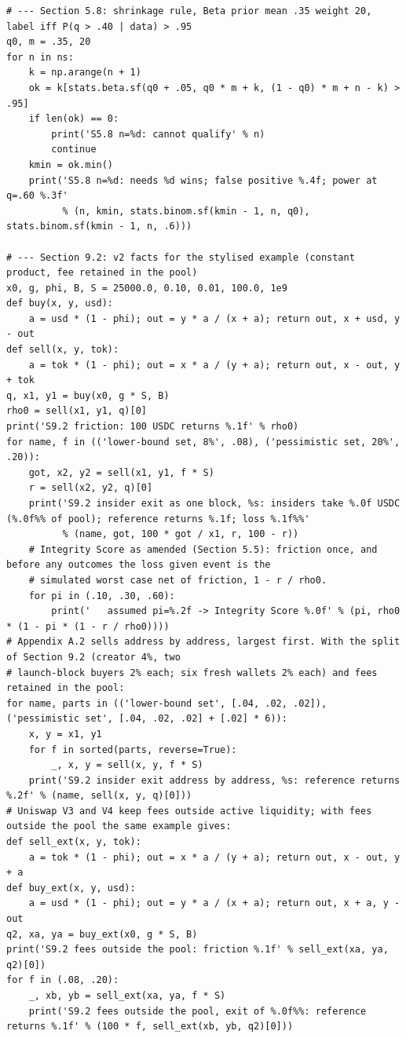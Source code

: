 \begin{verbatim}
# --- Section 5.8: shrinkage rule, Beta prior mean .35 weight 20, label iff P(q > .40 | data) > .95
q0, m = .35, 20
for n in ns:
    k = np.arange(n + 1)
    ok = k[stats.beta.sf(q0 + .05, q0 * m + k, (1 - q0) * m + n - k) > .95]
    if len(ok) == 0:
        print('S5.8 n=%d: cannot qualify' % n)
        continue
    kmin = ok.min()
    print('S5.8 n=%d: needs %d wins; false positive %.4f; power at q=.60 %.3f'
          % (n, kmin, stats.binom.sf(kmin - 1, n, q0), stats.binom.sf(kmin - 1, n, .6)))

# --- Section 9.2: v2 facts for the stylised example (constant product, fee retained in the pool)
x0, g, phi, B, S = 25000.0, 0.10, 0.01, 100.0, 1e9
def buy(x, y, usd):
    a = usd * (1 - phi); out = y * a / (x + a); return out, x + usd, y - out
def sell(x, y, tok):
    a = tok * (1 - phi); out = x * a / (y + a); return out, x - out, y + tok
q, x1, y1 = buy(x0, g * S, B)
rho0 = sell(x1, y1, q)[0]
print('S9.2 friction: 100 USDC returns %.1f' % rho0)
for name, f in (('lower-bound set, 8%', .08), ('pessimistic set, 20%', .20)):
    got, x2, y2 = sell(x1, y1, f * S)
    r = sell(x2, y2, q)[0]
    print('S9.2 insider exit as one block, %s: insiders take %.0f USDC (%.0f%% of pool); reference returns %.1f; loss %.1f%%'
          % (name, got, 100 * got / x1, r, 100 - r))
    # Integrity Score as amended (Section 5.5): friction once, and before any outcomes the loss given event is the
    # simulated worst case net of friction, 1 - r / rho0.
    for pi in (.10, .30, .60):
        print('   assumed pi=%.2f -> Integrity Score %.0f' % (pi, rho0 * (1 - pi * (1 - r / rho0))))
# Appendix A.2 sells address by address, largest first. With the split of Section 9.2 (creator 4%, two
# launch-block buyers 2% each; six fresh wallets 2% each) and fees retained in the pool:
for name, parts in (('lower-bound set', [.04, .02, .02]), ('pessimistic set', [.04, .02, .02] + [.02] * 6)):
    x, y = x1, y1
    for f in sorted(parts, reverse=True):
        _, x, y = sell(x, y, f * S)
    print('S9.2 insider exit address by address, %s: reference returns %.2f' % (name, sell(x, y, q)[0]))
# Uniswap V3 and V4 keep fees outside active liquidity; with fees outside the pool the same example gives:
def sell_ext(x, y, tok):
    a = tok * (1 - phi); out = x * a / (y + a); return out, x - out, y + a
def buy_ext(x, y, usd):
    a = usd * (1 - phi); out = y * a / (x + a); return out, x + a, y - out
q2, xa, ya = buy_ext(x0, g * S, B)
print('S9.2 fees outside the pool: friction %.1f' % sell_ext(xa, ya, q2)[0])
for f in (.08, .20):
    _, xb, yb = sell_ext(xa, ya, f * S)
    print('S9.2 fees outside the pool, exit of %.0f%%: reference returns %.1f' % (100 * f, sell_ext(xb, yb, q2)[0]))


\end{verbatim}
